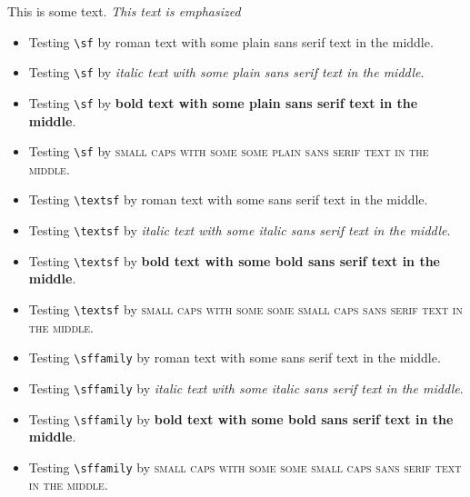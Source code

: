 ﻿\documentclass{article}
\begin{document}
This is some text.  \emph{This text is emphasized}
\begin{itemize}
\item
Testing \verb#\sf# by \textrm{roman text with {\sf some plain sans serif text} in the middle}.
\item
Testing \verb#\sf# by \textit{italic text with {\sf some plain sans serif text} in the middle}.
\item
Testing \verb#\sf# by \textbf{bold text with {\sf some plain sans serif text} in the middle}.
\item
Testing \verb#\sf# by \textsc{small caps with some {\sf some plain sans serif text} in the middle}.
\item
Testing \verb#\textsf# by \textrm{roman text with \textsf{some sans serif text} in the middle}.
\item
Testing \verb#\textsf# by \textit{italic text with \textsf{some italic sans serif text} in the middle}.
\item
Testing \verb#\textsf# by \textbf{bold text with \textsf{some bold sans serif text} in the middle}.
\item
Testing \verb#\textsf# by \textsc{small caps with some \textsf{some small caps sans serif text} in the middle}.
\item
Testing \verb#\sffamily# by \textrm{roman text with {\sffamily some sans serif text} in the middle}.
\item
Testing \verb#\sffamily# by \textit{italic text with {\sffamily some italic sans serif text} in the middle}.
\item
Testing \verb#\sffamily# by \textbf{bold text with {\sffamily some bold sans serif text} in the middle}.
\item
Testing \verb#\sffamily# by \textsc{small caps with some {\sffamily some small caps sans serif text} in the middle}.
\end{itemize}
\end{document}
